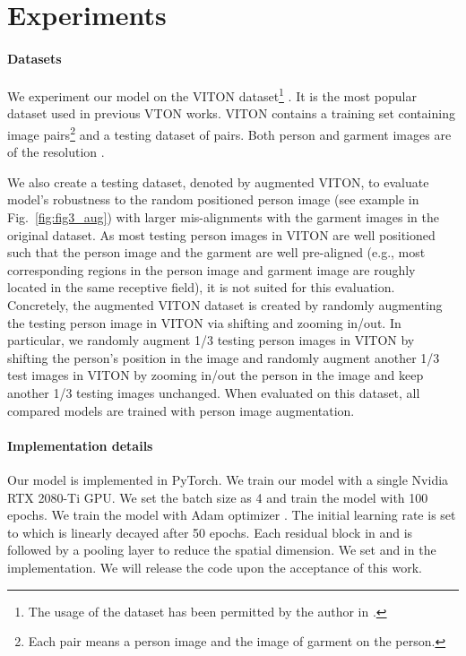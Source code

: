 \documentclass[10pt,twocolumn,letterpaper]{article}
\begin{document}
\section{Experiments}

\paragraph{Datasets} We experiment our model on the VITON dataset\footnote{The usage of the dataset has been permitted by the author in \cite{han2018viton}.} \cite{han2018viton}. It is the most popular dataset used in previous VTON works. VITON contains a training set containing  image pairs\footnote{Each pair means a person image and the image of garment on the person.} and a testing dataset of  pairs. Both person and garment images are of the resolution . 

We also create a testing dataset, denoted by augmented VITON, to evaluate model's robustness to the random positioned person image (see example in Fig.~\ref{fig:fig3_aug}) with larger mis-alignments with the garment images in the original dataset. As most testing person images in VITON are well positioned such that the person image and the garment are well pre-aligned (e.g., most corresponding regions in the person image and garment image are roughly located in the same receptive field), it is not suited for this evaluation. Concretely, the augmented VITON dataset is created by randomly augmenting the testing person image in VITON via shifting and zooming in/out. In particular, we randomly augment 1/3 testing person images in VITON by shifting the person's position in the image and randomly augment another 1/3 test images in VITON by zooming in/out the person in the image and keep another 1/3 testing images unchanged. When evaluated on this dataset,  all compared models are trained with person image augmentation.


\paragraph{Implementation details} Our model is implemented in PyTorch. We train our model with a single Nvidia RTX 2080-Ti GPU. We set the batch size as 4 and train the model with 100 epochs. We train the model with Adam optimizer \cite{kingma2014adam}. The initial learning rate is set to  which is linearly decayed after 50 epochs. Each residual block in  and  is followed by a pooling layer to reduce the spatial dimension. We set  and  in the implementation. We will release the code upon the acceptance of this work.
\vspace{-0.4cm}
\end{document}
